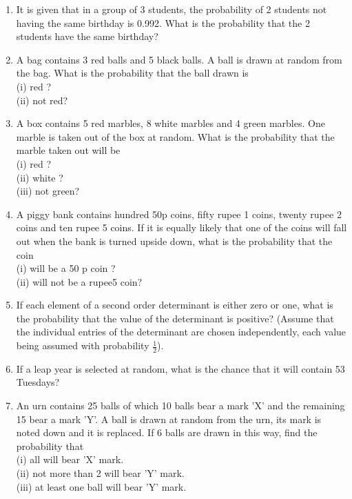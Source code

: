 \renewcommand{\theequation}{\theenumi}
\begin{enumerate}[label=\thesection.\arabic*.,ref=\thesection.\theenumi]

\item It is given that in a group of 3 students, the probability of 2 students not having the
same birthday is 0.992. What is the probability that the 2 students have the same
birthday?
\item A bag contains 3 red balls and 5 black balls. A ball is drawn at random from the bag.
What is the probability that the ball drawn is\\ 
(i) red ? \\
(ii) not red?
\item A box contains 5 red marbles, 8 white marbles and 4 green marbles. One marble is taken
out of the box at random. What is the probability that the marble taken out will be\\
(i) red ?\\
(ii) white ? \\
(iii) not green?
\item A piggy bank contains hundred 50p coins, fifty rupee 1 coins, twenty rupee 2 coins and ten rupee 5 coins. If it is equally likely that one of the coins will fall out when the bank is turned upside down, what is the probability that the coin \\
(i) will be a 50 p coin ?\\
(ii) will not be a rupee5 coin?\item If each element of a second order determinant is either zero or one, what is the
probability that the value of the determinant is positive? (Assume that the individual entries of the determinant are chosen independently, each value being
assumed with probability $\frac{1}{2}$).\\
\item If a leap year is selected at random, what is the chance that it will contain 53
Tuesdays?\\
\item An urn contains 25 balls of which 10 balls bear a mark 'X' and the remaining 15 bear a mark 'Y'. A ball is drawn at random from the urn, its mark is noted down and it is replaced. If 6 balls are drawn in this way, find the probability that\\
(i) all will bear 'X' mark.\\
(ii) not more than 2 will bear 'Y' mark.\\
(iii) at least one ball will bear 'Y' mark.\\

\end{enumerate}

